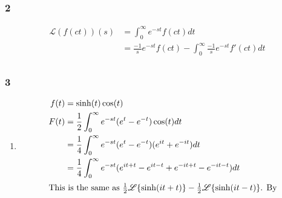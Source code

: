 \documentclass[a4paper]{article}
\newcommand{\ex}[1]{\subsubsection*{#1}}
\begin{document}
\ex{2}

\begin{align}
    \mathscr{L}(f(ct))(s) &= \int_0^\infty{e^{-st} f(ct) dt} \\
    &= \frac{-1}{s}e^{-st}f(ct) - \int_0^\infty{\frac{-1}{s}e^{-st}f'(ct) dt} \\
\end{align}

\ex{3}

\begin{enumerate}[label=\alph*)]
    \item 
        \begin{align}
            f(t) &= \sinh(t)\cos(t) \\
            F(t) &= \frac{1}{2}\int_0^\infty{e^{-st} (e^t - e^{-t})\cos(t) dt} \\
            &= \frac{1}{4}\int_0^\infty{e^{-st} (e^t - e^{-t})(e^{it} + e^{-it}) dt} \\
            &= \frac{1}{4}\int_0^\infty{e^{-st} (e^{it+t} - e^{it-t} +
                e^{-it+t} - e^{-it-t}) dt} \\
            \intertext{This is the same as \(\frac{1}{2} \mathscr{L}
                \{\sinh(it+t)\} - \frac{1}{2} \mathscr{L} \{\sinh(it-t)\}\). By
}
\end{align}
\end{enumerate}
\end{document}
